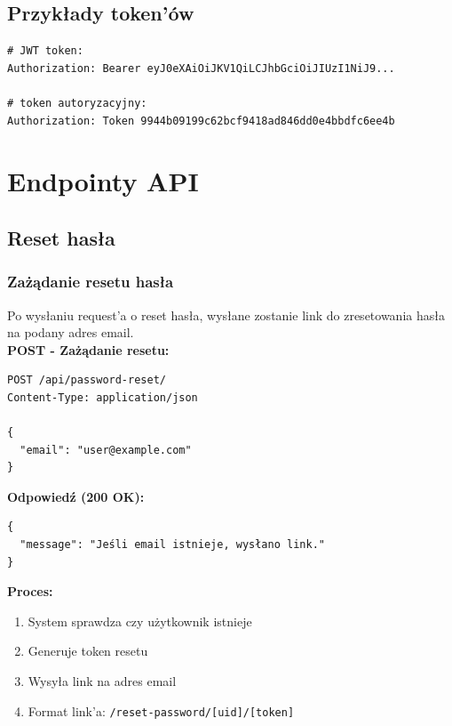 \documentclass[a4paper,12pt]{article}
\begin{document}
\subsection{Przykłady token'ów}

\begin{lstlisting}
# JWT token:
Authorization: Bearer eyJ0eXAiOiJKV1QiLCJhbGciOiJIUzI1NiJ9...

# token autoryzacyjny:
Authorization: Token 9944b09199c62bcf9418ad846dd0e4bbdfc6ee4b
\end{lstlisting}

\newpage

\section{Endpointy API}

\subsection{Reset hasła}

\subsubsection{Zażądanie resetu hasła}

Po wysłaniu request'a o reset hasła, wysłane zostanie link do zresetowania hasła na podany adres email. \\

\textbf{POST - Zażądanie resetu:}
\begin{lstlisting}
POST /api/password-reset/
Content-Type: application/json

{
  "email": "user@example.com"
}
\end{lstlisting}

\textbf{Odpowiedź (200 OK):}
\begin{lstlisting}
{
  "message": "Jeśli email istnieje, wysłano link."
}
\end{lstlisting}

\textbf{Proces:}
\begin{enumerate}[label=\arabic*.]
    \item System sprawdza czy użytkownik istnieje
    \item Generuje token resetu
    \item Wysyła link na adres email
    \item Format link'a: \texttt{/reset-password/[uid]/[token]}
\end{enumerate}
\end{document}
